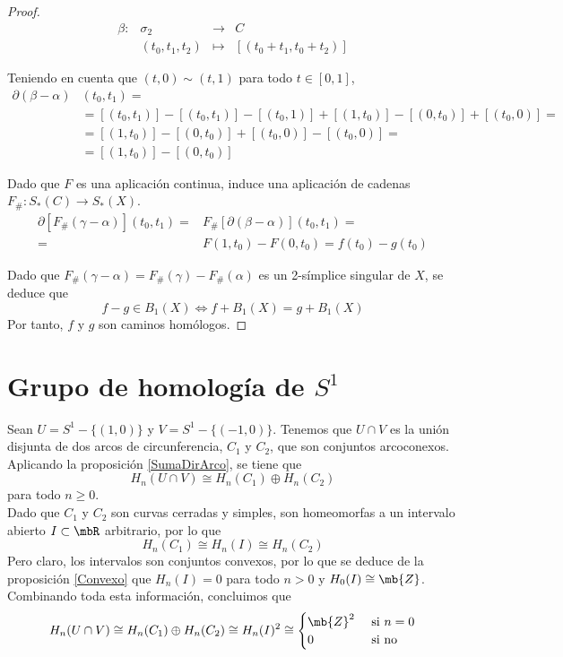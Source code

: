 \begin{proof}
\[\begin{array}{cccc}\beta:& \sigma_2 &\longrightarrow &C\\
            &(t_0,t_1,t_2)&\mapsto             &[(t_0+t_1,t_0+t_2)]
\end{array}\]

Teniendo en cuenta que $(t,0)\sim (t,1)$ para todo $t \in [0,1]$,
\begin{align*}
\partial(\beta-\alpha)&(t_0,t_1)=\\
             &=[(t_0,t_1)]-[(t_0,t_1)]-[(t_0,1)]+[(1,t_0)]-[(0,t_0)]+[(t_0,0)]=\\
             &=[(1,t_0)]-[(0,t_0)]+[(t_0,0)]-[(t_0,0)]=\\
             &=[(1,t_0)]-[(0,t_0)]
\end{align*}

Dado que $F$ es una aplicación continua, induce una aplicación de cadenas $F_\#: S_*(C) \rightarrow S_*(X)$.
\begin{align*}
\partial [F_\#(\gamma-\alpha)](t_0,t_1)=&F_\#[\partial(\beta- \alpha)](t_0,t_1)=\\
                                       =&F(1,t_0)-F(0,t_0)=f(t_0)-g(t_0)
\end{align*}

Dado que $F_\#(\gamma-\alpha)=F_\#(\gamma)-F_\#(\alpha)$ es un 2-símplice singular de $X$, se deduce que $$f-g \in B_1(X) \iff f+B_1(X)=g+B_1(X)$$ Por tanto, $f$ y $g$ son caminos homólogos.\end{proof}

\section{Grupo de homología de $S^1$}
Sean $U=S^1-\{(1,0)\}$ y $V=S^1-\{(-1,0)\}$. Tenemos que $U\cap V$ es la unión disjunta de dos arcos de circunferencia, $C_1$ y $C_2$, que son conjuntos arcoconexos. Aplicando la proposición \ref{SumaDirArco}, se tiene que $$H_n(U\cap V) \cong H_n(C_1)\oplus H_n(C_2)$$ para todo $n \geq 0$.
\\

Dado que $C_1$ y $C_2$ son curvas cerradas y simples, son homeomorfas a un intervalo abierto $I \subset \mbR$ arbitrario, por lo que $$H_n(C_1) \cong H_n(I) \cong H_n(C_2)$$ Pero claro, los intervalos son conjuntos convexos, por lo que se deduce de la proposición \ref{Convexo} que $H_n(I)=0$ para todo $n > 0$ y $H_0(I)\cong\mb{Z}$.
\\

Combinando toda esta información, concluimos que $$H_n(U\cap V) \cong H_n(C_1)\oplus H_n(C_2) \cong H_n(I)^2 \cong \begin{cases}\mb{Z}^2 &\mbox{ si } n =0 \\ 0 &\mbox{ si no}\end{cases}$$

